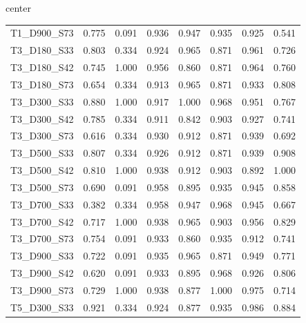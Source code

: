 \begin{table}[H]
\begin{adjustbox}{center}
\begin{tabular}{lrrrrrrr}
T1\_D900\_S73 & 0.775 & 0.091 & 0.936 & 0.947 & 0.935 & 0.925 & 0.541 \\
T3\_D180\_S33 & 0.803 & 0.334 & 0.924 & 0.965 & 0.871 & 0.961 & 0.726 \\
T3\_D180\_S42 & 0.745 & 1.000 & 0.956 & 0.860 & 0.871 & 0.964 & 0.760 \\
T3\_D180\_S73 & 0.654 & 0.334 & 0.913 & 0.965 & 0.871 & 0.933 & 0.808 \\
T3\_D300\_S33 & 0.880 & 1.000 & 0.917 & 1.000 & 0.968 & 0.951 & 0.767 \\
T3\_D300\_S42 & 0.785 & 0.334 & 0.911 & 0.842 & 0.903 & 0.927 & 0.741 \\
T3\_D300\_S73 & 0.616 & 0.334 & 0.930 & 0.912 & 0.871 & 0.939 & 0.692 \\
T3\_D500\_S33 & 0.807 & 0.334 & 0.926 & 0.912 & 0.871 & 0.939 & 0.908 \\
T3\_D500\_S42 & 0.810 & 1.000 & 0.938 & 0.912 & 0.903 & 0.892 & 1.000 \\
T3\_D500\_S73 & 0.690 & 0.091 & 0.958 & 0.895 & 0.935 & 0.945 & 0.858 \\
T3\_D700\_S33 & 0.382 & 0.334 & 0.958 & 0.947 & 0.968 & 0.945 & 0.667 \\
T3\_D700\_S42 & 0.717 & 1.000 & 0.938 & 0.965 & 0.903 & 0.956 & 0.829 \\
T3\_D700\_S73 & 0.754 & 0.091 & 0.933 & 0.860 & 0.935 & 0.912 & 0.741 \\
T3\_D900\_S33 & 0.722 & 0.091 & 0.935 & 0.965 & 0.871 & 0.949 & 0.771 \\
T3\_D900\_S42 & 0.620 & 0.091 & 0.933 & 0.895 & 0.968 & 0.926 & 0.806 \\
T3\_D900\_S73 & 0.729 & 1.000 & 0.938 & 0.877 & 1.000 & 0.975 & 0.714 \\
T5\_D300\_S33 & 0.921 & 0.334 & 0.924 & 0.877 & 0.935 & 0.986 & 0.884 \\
			\bottomrule
		\end{tabular}
	\end{adjustbox}
\end{table}

\newpage
